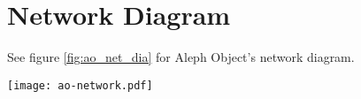 \section{Network Diagram}
See figure \ref{fig:ao_net_dia} for Aleph Object's network diagram.

\begin{sidewaysfigure}[p]
 \texttt{[image: ao-network.pdf]}
 \caption{Network Diagram}
 \label{fig:ao_net_dia}
\end{sidewaysfigure}
